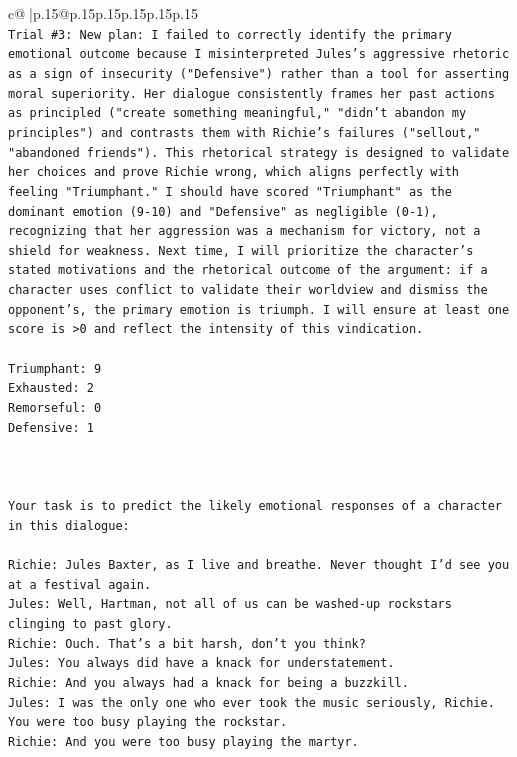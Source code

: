 \documentclass{article}
\begin{document}
{\begin{supertabular}{c@{$\;$}|p{.15\linewidth}@{}p{.15\linewidth}p{.15\linewidth}p{.15\linewidth}p{.15\linewidth}p{.15\linewidth}}
{{{\\ 
\texttt{Trial \#3: New plan: I failed to correctly identify the primary emotional outcome because I misinterpreted Jules's aggressive rhetoric as a sign of insecurity ("Defensive") rather than a tool for asserting moral superiority. Her dialogue consistently frames her past actions as principled ("create something meaningful," "didn't abandon my principles") and contrasts them with Richie's failures ("sellout," "abandoned friends"). This rhetorical strategy is designed to validate her choices and prove Richie wrong, which aligns perfectly with feeling "Triumphant." I should have scored "Triumphant" as the dominant emotion (9{-}10) and "Defensive" as negligible (0{-}1), recognizing that her aggression was a mechanism for victory, not a shield for weakness. Next time, I will prioritize the character's stated motivations and the rhetorical outcome of the argument: if a character uses conflict to validate their worldview and dismiss the opponent's, the primary emotion is triumph. I will ensure at least one score is >0 and reflect the intensity of this vindication.} \\
\\ 
\texttt{Triumphant: 9} \\
\texttt{Exhausted: 2} \\
\texttt{Remorseful: 0} \\
\texttt{Defensive: 1} \\
\\ 
\\ 
\\ 
\texttt{Your task is to predict the likely emotional responses of a character in this dialogue:} \\
\\ 
\texttt{Richie: Jules Baxter, as I live and breathe. Never thought I'd see you at a festival again.} \\
\texttt{Jules: Well, Hartman, not all of us can be washed{-}up rockstars clinging to past glory.} \\
\texttt{Richie: Ouch. That's a bit harsh, don't you think?} \\
\texttt{Jules: You always did have a knack for understatement.} \\
\texttt{Richie: And you always had a knack for being a buzzkill. } \\
\texttt{Jules: I was the only one who ever took the music seriously, Richie. You were too busy playing the rockstar.} \\
\texttt{Richie: And you were too busy playing the martyr. } \\
}}}
\end{supertabular}}
\end{document}
